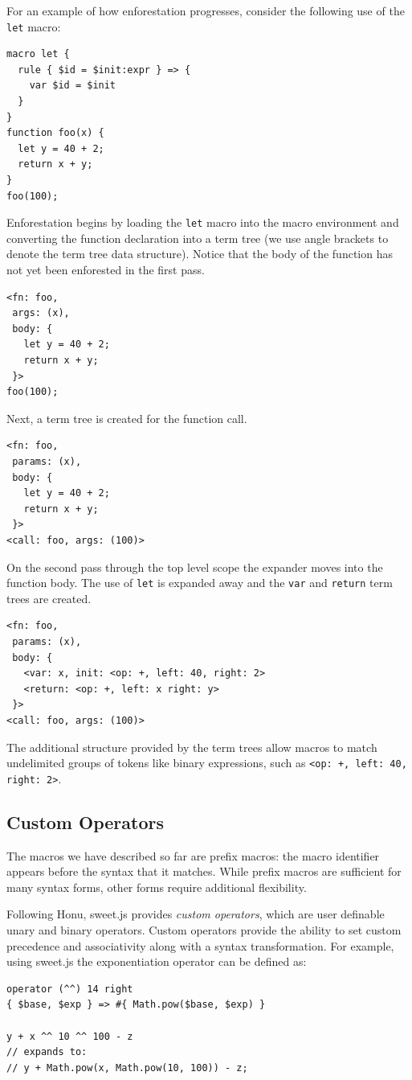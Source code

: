 \documentclass[preprint,10pt]{sigplanconf}
\begin{document}
For an example of how enforestation progresses, consider the following
use of the \verb!let! macro:
\begin{lstlisting}
macro let {
  rule { $id = $init:expr } => {
    var $id = $init
  }
}
function foo(x) {
  let y = 40 + 2;
  return x + y;
}
foo(100);
\end{lstlisting}
Enforestation begins by loading the \verb!let! macro into the macro
environment and converting the function declaration into a term tree
(we use angle brackets to denote the term tree data structure). Notice
that the body of the function has not yet been enforested in the first
pass.
\begin{lstlisting}
<fn: foo, 
 args: (x), 
 body: {
   let y = 40 + 2;
   return x + y;
 }>
foo(100);
\end{lstlisting}
Next, a term tree is created for the function call.
\begin{lstlisting}
<fn: foo, 
 params: (x), 
 body: {
   let y = 40 + 2;
   return x + y;
 }>
<call: foo, args: (100)>
\end{lstlisting}
On the second pass through the top level scope the expander moves into
the function body. The use of \verb!let! is expanded away and the
\verb!var! and \verb!return! term trees are created.
\begin{lstlisting}
<fn: foo, 
 params: (x), 
 body: {
   <var: x, init: <op: +, left: 40, right: 2>
   <return: <op: +, left: x right: y> 
 }>
<call: foo, args: (100)>
\end{lstlisting}

The additional structure provided by the term trees allow macros to
match undelimited groups of tokens like binary expressions, such as
\verb!<op: +, left: 40, right: 2>!.

\subsection{Custom Operators}
The macros we have described so far are prefix macros: the macro
identifier appears before the syntax that it matches. While prefix
macros are sufficient for many syntax forms, other forms require
additional flexibility.

Following Honu, sweet.js provides \emph{custom operators}, which are
user definable unary and binary operators. Custom operators provide
the ability to set custom precedence and associativity along with a
syntax transformation. For example, using sweet.js the exponentiation
operator can be defined as:
\begin{lstlisting}
operator (^^) 14 right
{ $base, $exp } => #{ Math.pow($base, $exp) }

y + x ^^ 10 ^^ 100 - z
// expands to:
// y + Math.pow(x, Math.pow(10, 100)) - z;
\end{lstlisting}
\end{document}

